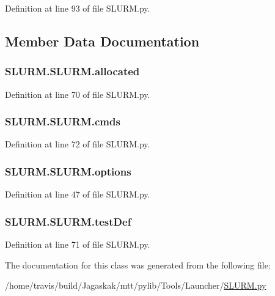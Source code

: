 Definition at line 93 of file S\-L\-U\-R\-M.\-py.



\subsection{Member Data Documentation}
\hypertarget{classSLURM_1_1SLURM_aee4130d6ff2007d08fad045aedd69781}{
\subsubsection[{allocated}]{\setlength{\rightskip}{0pt plus 5cm}S\-L\-U\-R\-M.\-S\-L\-U\-R\-M.\-allocated}}\label{classSLURM_1_1SLURM_aee4130d6ff2007d08fad045aedd69781}


Definition at line 70 of file S\-L\-U\-R\-M.\-py.

\hypertarget{classSLURM_1_1SLURM_ab755a940fd09c8fa416c177f692d31d6}{
\subsubsection[{cmds}]{\setlength{\rightskip}{0pt plus 5cm}S\-L\-U\-R\-M.\-S\-L\-U\-R\-M.\-cmds}}\label{classSLURM_1_1SLURM_ab755a940fd09c8fa416c177f692d31d6}


Definition at line 72 of file S\-L\-U\-R\-M.\-py.

\hypertarget{classSLURM_1_1SLURM_a652a43986b8bda5c6ddb866ab0513ac8}{
\subsubsection[{options}]{\setlength{\rightskip}{0pt plus 5cm}S\-L\-U\-R\-M.\-S\-L\-U\-R\-M.\-options}}\label{classSLURM_1_1SLURM_a652a43986b8bda5c6ddb866ab0513ac8}


Definition at line 47 of file S\-L\-U\-R\-M.\-py.

\hypertarget{classSLURM_1_1SLURM_a9b08ef79e039a8524f1fa6712b45182b}{
\subsubsection[{test\-Def}]{\setlength{\rightskip}{0pt plus 5cm}S\-L\-U\-R\-M.\-S\-L\-U\-R\-M.\-test\-Def}}\label{classSLURM_1_1SLURM_a9b08ef79e039a8524f1fa6712b45182b}


Definition at line 71 of file S\-L\-U\-R\-M.\-py.



The documentation for this class was generated from the following file\-:\begin{DoxyCompactItemize}
\item 
/home/travis/build/\-Jagaskak/mtt/pylib/\-Tools/\-Launcher/\hyperlink{SLURM_8py}{S\-L\-U\-R\-M.\-py}\end{DoxyCompactItemize}

